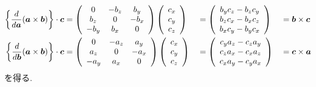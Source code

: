 \begin{alignat}{3}
   \left\{ \frac{d}{d \bm{a}} (\bm{a} \times \bm{b}) \right\} \cdot \bm{c}
&=
   \left(
         \begin{array}{ccc}
             0  & -b_{z} &  b_{y} \\
          b_{z} &      0 & -b_{x} \\
         -b_{y} &  b_{x} &     0  \\
         \end{array}
   \right)
   \left(
         \begin{array}{ccc}
           c_{x}  \\
           c_{y} \\
           c_{z}  \\
         \end{array}
   \right)
&&=
   \left(
         \begin{array}{ccc}
          b_{y}c_{z} - b_{z}c_{y} \\
          b_{z}c_{x} - b_{x}c_{z} \\
          b_{x}c_{y} - b_{y}c_{x} \\
         \end{array}
   \right)
&&=
   \bm{b} \times \bm{c}
 \notag
 \\
   \left\{ \frac{d}{d \bm{b}} (\bm{a} \times \bm{b}) \right\} \cdot \bm{c}
&=
   \left(
         \begin{array}{ccc}
             0  & -a_{z} &  a_{y} \\
          a_{z} &      0 & -a_{x} \\
         -a_{y} &  a_{x} &     0  \\
         \end{array}
  \right)
  \left(
         \begin{array}{ccc}
           c_{x}  \\
           c_{y} \\
           c_{z}  \\
         \end{array}
  \right)
&&=
  \left(
        \begin{array}{ccc}
         c_{y}a_{z} - c_{z}a_{y} \\
         c_{z}a_{x} - c_{x}a_{z} \\
         c_{x}a_{y} - c_{y}a_{x} \\
        \end{array}
  \right)
&&=
  \bm{c} \times \bm{a}
 \notag
\end{alignat}
を得る. 
\\


